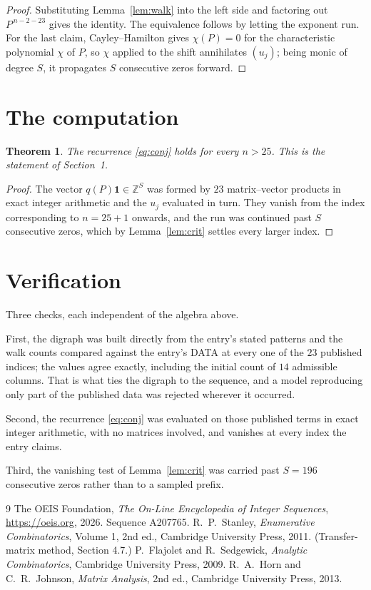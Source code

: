 \documentclass[11pt,a4paper]{article}
\theoremstyle{plain}
\newtheorem{theorem}{Theorem}
\theoremstyle{definition}
\begin{document}
\begin{proof}
Substituting Lemma~\ref{lem:walk} into the left side and factoring out
$P^{\,n-2-23}$ gives the identity. The equivalence follows by letting the exponent
run. For the last claim, Cayley--Hamilton gives $\chi(P)=0$ for the characteristic
polynomial $\chi$ of $P$, so $\chi$ applied to the shift annihilates $(u_j)$; being monic of
degree $S$, it propagates $S$ consecutive zeros forward.
\end{proof}

\section{The computation}

\begin{theorem}
The recurrence \eqref{eq:conj} holds for every $n>25$. This is the statement of
Section~1.
\end{theorem}

\begin{proof}
The vector $q(P)\mathbf{1}\in\mathbb{Z}^{S}$ was formed by $23$ matrix--vector
products in exact integer arithmetic and the $u_j$ evaluated in turn. They vanish from the
index corresponding to $n=25+1$ onwards, and the run was continued past $S$ consecutive
zeros, which by Lemma~\ref{lem:crit} settles every larger index.
\end{proof}

\section{Verification}

Three checks, each independent of the algebra above.

First, the digraph was built directly from the entry's stated patterns and the walk counts
compared against the entry's DATA at every one of the $23$ published indices; the
values agree exactly, including the initial count of $14$ admissible columns. That is
what ties the digraph to the sequence, and a model reproducing only part of the published
data was rejected wherever it occurred.

Second, the recurrence \eqref{eq:conj} was evaluated on those published terms in exact
integer arithmetic, with no matrices involved, and vanishes at every index the entry claims.

Third, the vanishing test of Lemma~\ref{lem:crit} was carried past $S=196$ consecutive
zeros rather than to a sampled prefix.

\begin{thebibliography}{9}
 The OEIS Foundation, \emph{The On-Line Encyclopedia of Integer
Sequences}, \url{https://oeis.org}, 2026. Sequence A207765.
 R.~P.~Stanley, \emph{Enumerative Combinatorics}, Volume 1, 2nd ed.,
Cambridge University Press, 2011. (Transfer-matrix method, Section 4.7.)
 P.~Flajolet and R.~Sedgewick, \emph{Analytic Combinatorics}, Cambridge
University Press, 2009.
 R.~A.~Horn and C.~R.~Johnson, \emph{Matrix Analysis}, 2nd ed., Cambridge
University Press, 2013.
\end{thebibliography}
\end{document}

